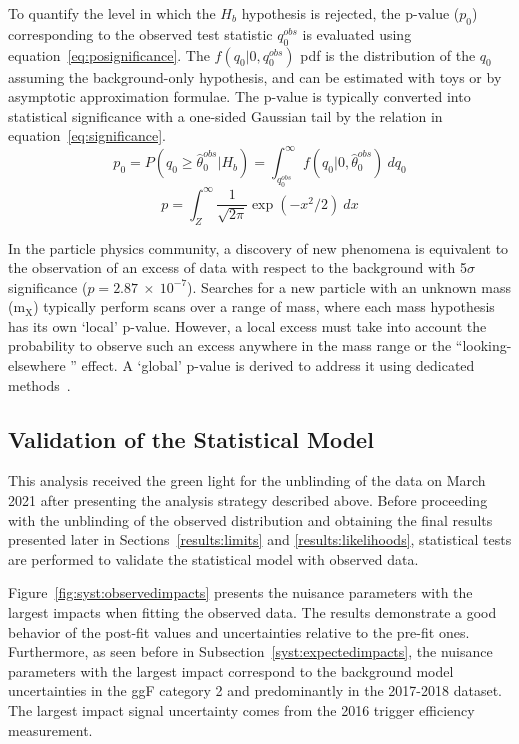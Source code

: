 To quantify the level in which the $H_{b}$ hypothesis is rejected, the p-value ($p_{0}$) corresponding to the observed test statistic $q_{0}^{obs}$ is evaluated using equation~\ref{eq:posignificance}. The $f(q_{0}|0,q_{0}^{obs})$ pdf is the distribution of the $q_{0}$ assuming the background-only hypothesis, and can be estimated with toys or by asymptotic approximation formulae. The p-value is typically converted into statistical significance with a one-sided Gaussian tail by the relation in equation~\ref{eq:significance}. 
\begin{equation} \label{eq:posignificance}
p_{0}  = P(q_{0} \geq \hat{\theta}_{0}^{obs} | H_{b}  )  
       =\int^{\infty}_{q_{0}^{obs}}  f(q_{0}|0,\hat{\theta}_{0}^{obs})~dq_{0} 
\end{equation}
\begin{equation} \label{eq:significance}
p = \int^{\infty}_{Z}  \frac{1}{\sqrt{2\pi}} \exp{(-x^{2}/2)}~dx
\end{equation}

In the particle physics community, a discovery of new phenomena is equivalent to the observation of an excess of data with respect to the background with 5$\sigma$ significance ($p=2.87~\times~10^{-7}$). Searches for a new particle with an unknown mass ($\mathrm{m_{X}}$) typically perform scans over a range of mass, where each mass hypothesis has its own `local' p-value. However, a local excess must take into account the probability to observe such an excess anywhere in the mass range or the ``looking-elsewhere '' effect. A `global' p-value is derived to address it using dedicated methods~\cite{Gross:2010qma}. 

\subsection{Validation of the Statistical Model} \label{results:modelvalidation}
This analysis received the green light for the unblinding of the data on March 2021 after presenting the analysis strategy described above. Before proceeding with the unblinding of the observed distribution and obtaining the final results presented later in Sections~\ref{results:limits} and \ref{results:likelihoods}, statistical tests are performed to validate the statistical model with observed data.

Figure~\ref{fig:syst:observedimpacts} presents the nuisance parameters with the largest impacts when fitting the observed data. The results demonstrate a good behavior of the post-fit values and uncertainties relative to the pre-fit ones. Furthermore, as seen before in Subsection~\ref{syst:expectedimpacts}, the nuisance parameters with the largest impact correspond to the background model uncertainties in the ggF category 2 and predominantly in the 2017-2018 dataset. The largest impact signal uncertainty comes from the 2016 trigger efficiency measurement.

